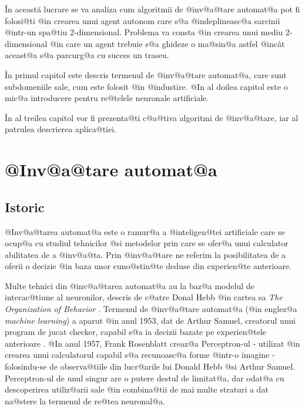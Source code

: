 \^ In aceast\u a lucrare se va analiza cum algoritmii de @inv@a@tare automat@a  pot fi folosi@ti @in crearea unui agent autonom care s@a @indeplineasc@a sarcinii @intr-un spa@tiu 2-dimensional. Problema va consta @in crearea unui mediu 2-dimensional @in care un agent trebuie s@a ghideze o ma@sin@a astfel @inc\^ at aceast@a s@a parcurg@a cu succes un traseu.
\hspace{0.2cm}

\^ In primul capitol este descris termenul de @inv@a@tare automat@a, care sunt subdomeniile sale, cum este folosit @in @industire. @In al doilea capitol este o mic@a introducere pentru re@telele neuronale artificiale.

\^ In al treilea capitol vor fi prezenta@ti c@a@tiva algoritmi de @inv@a@tare, iar al patrulea descrierea aplica@tiei.

\newpage

\chapter{ @Inv@a@tare automat@a }

\section{Istoric}

	@Inv@a@tarea automat@a este o ramur@a a @inteligen@tei artificiale care se ocup@a cu studiul tehnicilor @si metodelor prin care se ofer@a unui calculator abilitatea de a @inv@a@ta. Prin @inv@a@tare ne referim la posibilitatea de a oferii o decizie @in baza unor cuno@stin@te deduse din experien@te anterioare.

 Multe tehnici din @inv@a@tarea automat@a au la baz@a modelul de interac@tiune al neuronilor, descris de c@atre Donal Hebb @in cartea sa {\sl The Organization of Behavior} \cite{donald-hebb-book}. Termenul de @inv@a@tare automat@a (@in englez@a {\sl machine learning}) a aparut @in anul 1953, dat de Arthur Samuel, creatorul unui program de jucat checker, capabil s@a ia decizii bazate pe experien@tele anterioare \cite{arthur-samuel}. @In anul 1957, Frank Rosenblatt creaz@a Perceptron-ul - utilizat @in crearea unui calculatorul capabil s@a recunoasc@a forme @intr-o imagine - folosindu-se de observa@tiile din lucr@arile lui Donald Hebb @si Arthur Samuel. Perceptron-ul de unul singur are o putere destul de limitat@a, dar odat@a cu descoperirea utiliz@arii sale @in combina@tii de mai multe straturi a dat na@stere la termenul de re@tea neuronal@a. 
 
